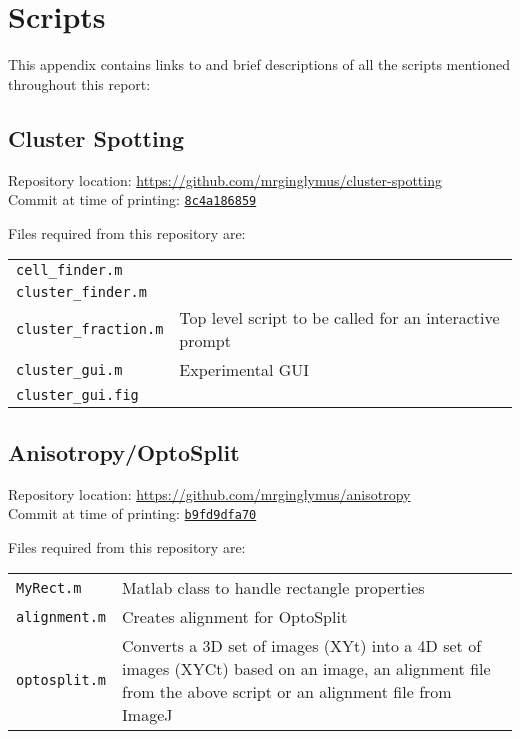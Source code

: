 \documentclass[../main.tex]{subfiles}
\begin{document}
\section{Scripts}

This appendix contains links to and brief descriptions of all the scripts mentioned throughout this report:

\subsection{Cluster Spotting}
\label{sec:scripts:clusters}
Repository location: \url{https://github.com/mrginglymus/cluster-spotting}\\
Commit at time of printing: \href{https://github.com/mrginglymus/cluster-spotting/tree/8c4a1868594707eb2215a4a49fbc1fe8dbecb600}{\texttt{8c4a186859}}

Files required from this repository are:


\begin{tabular}{ll}
\texttt{cell\_finder.m}	&	\\
\texttt{cluster\_finder.m}	&	\\
\texttt{cluster\_fraction.m}	&	Top level script to be called for an interactive prompt	\\
\texttt{cluster\_gui.m}		&	Experimental GUI \\
\texttt{cluster\_gui.fig}	&	
\end{tabular}

\subsection{Anisotropy/OptoSplit}
\label{sec:scripts:anisotropy}
Repository location: \url{https://github.com/mrginglymus/anisotropy}\\
Commit at time of printing: \href{https://github.com/mrginglymus/anisotropy/tree/b9fd9dfa704d9a8bd9ffa42c45d398bc92c3b660}{\texttt{b9fd9dfa70}}

Files required from this repository are:


\begin{tabular}{lp{12cm}}
\texttt{MyRect.m}	&	Matlab class to handle rectangle properties \\
\texttt{alignment.m}	&	Creates alignment for OptoSplit \\
\texttt{optosplit.m}	&	Converts a 3D set of images (XYt) into a 4D set of images (XYCt) based on an image, an alignment file from the above script or an alignment file from ImageJ
\end{tabular}
\end{document}
